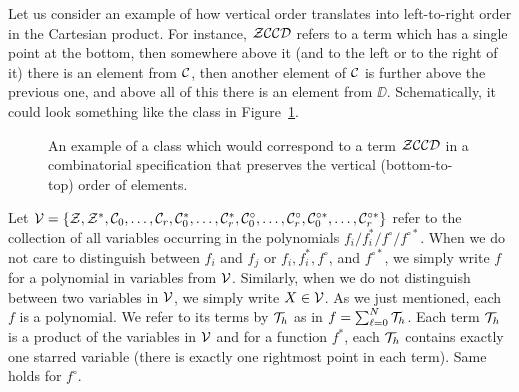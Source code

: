 \documentclass[12pt, a4paper, twoside]{report}
\begin{document}
Let us consider an example of how vertical order translates into left-to-right order in the Cartesian product. For instance, $\mathcal{Z}\mathcal{C}\mathcal{C}\mathcal{D}$ refers to a term which has a single point at the bottom, then somewhere above it (and to the left or to the right of it) there is an element from $\mathcal{C}$, then another element of $\mathcal{C}$ is further above the previous one, and above all of this there is an element from $\DD$. Schematically, it could look something like the class in Figure~\ref{fig:order}.

\begin{figure}[ht]
  \centering
  \caption{An example of a class which would correspond to a term $\mathcal{Z}\mathcal{C}\mathcal{C}\mathcal{D}$ in a combinatorial specification that preserves the vertical (bottom-to-top) order of elements.}
  \label{fig:order}
\end{figure}

Let $\mathcal{V} = \{\mathcal{Z},\mathcal{Z}^*,\mathcal{C}_0,\ldots,\mathcal{C}_r,\mathcal{C}^*_0,\ldots,\mathcal{C}_r^*, \mathcal{C}^\circ_0,\ldots,\mathcal{C}_r^\circ, \mathcal{C}^{\circ*}_0,\ldots,\mathcal{C}_r^{\circ*}\}$ refer to the collection of all variables occurring in the polynomials $f_i/f_i^*/f^\circ/f^{\circ*}$. When we do not care to distinguish between $f_i$ and $f_j$ or $f_i, f_i^*, f^\circ$, and $f^{\circ*}$, we simply write $f$ for a polynomial in variables from $\mathcal{V}$. Similarly, when we do not distinguish between two variables in $\mathcal{V}$, we simply write $X \in \mathcal{V}$. As we just mentioned, each $f$ is a polynomial. We refer to its terms by $\mathcal{T}_h$ as in $f = \sum_{\ell=0}^N\mathcal{T}_h$. Each term $\mathcal{T}_h$ is a product of the variables in $\mathcal{V}$ and for a function $f^*$, each $\mathcal{T}_h$ contains exactly one starred variable (there is exactly one rightmost point in each term). Same holds for $f^\circ$. 
\end{document}
